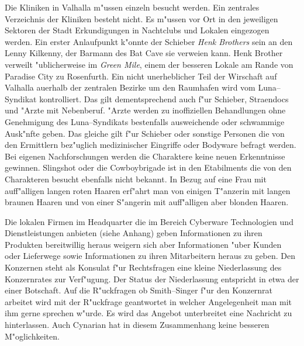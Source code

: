 Die Kliniken in Valhalla m"ussen einzeln besucht werden. Ein zentrales Verzeichnis der Kliniken besteht nicht. Es m"ussen vor Ort in den jeweiligen Sektoren der Stadt Erkundigungen in Nachtclubs und Lokalen eingezogen werden. Ein erster Anlaufpunkt k"onnte der Schieber \emph{Henk Brothers} sein an den Lenny Kilkenny, der Barmann des Bat Cave sie verwei\3en kann. Henk Brother verweilt "ublicherweise im \emph{Green Mile}, einem der besseren Lokale am Rande von Paradise City zu Rosenfurth. Ein nicht unerheblicher Teil der Wirschaft auf Valhalla au\3erhalb der zentralen Bezirke um den Raumhafen wird vom Luna--Syndikat kontrolliert. Das gilt dementsprechend auch f"ur Schieber, Stra\3endocs und "Arzte mit Nebenberuf. "Arzte werden zu inoffiziellen Behandlungen ohne Genehmigung des Luna--Syndikats bestenfalls ausweichende oder schwammige Ausk"nfte geben. Das gleiche gilt f"ur Schieber oder sonstige Personen die von den Ermittlern bez"uglich medizinischer Eingriffe oder Bodyware befragt werden. Bei eigenen Nachforschungen werden die Charaktere keine neuen Erkenntnisse gewinnen. Slingshot oder die Cowboybrigade ist in den Etabilments die von den Charakteren besucht ebenfalls  nicht bekannt. In Bezug auf eine Frau mit auff"alligen langen roten Haaren erf"ahrt man von einigen T"anzerin mit langen braunen Haaren und von einer S"angerin mit auff"alligen aber blonden Haaren.

Die lokalen Firmen im Headquarter die im Bereich Cyberware Technologien und Dienstleistungen anbieten (siehe Anhang) geben Informationen zu ihren Produkten bereitwillig heraus weigern sich aber Informationen "uber Kunden oder Lieferwege sowie Informationen zu ihren Mitarbeitern heraus zu geben. Den Konzernen steht als Konsulat f"ur Rechtsfragen eine kleine Niederlassung des Konzernrates zur Verf"ugung. Der Status der Niederlassung entspricht in etwa der einer Botschaft. Auf die R"uckfragen ob Smith--Singer f"ur den Konzernrat arbeitet wird mit der R"uckfrage geantwortet in welcher Angelegenheit man mit ihm gerne sprechen w"urde. Es wird das Angebot unterbreitet eine Nachricht zu hinterlassen. Auch Cynarian hat in diesem Zusammenhang keine besseren M"oglichkeiten.

